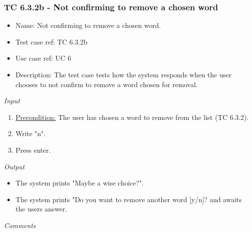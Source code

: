 \documentclass[12pt, letterpaper]{article}
\begin{document}
\subsubsection{TC 6.3.2b - Not confirming to remove a chosen word}
\begin{itemize}
	\item Name: Not confirming to remove a chosen word.
	\item Test case ref: TC 6.3.2b
	\item Use case ref: UC 6
	\item Description: The test case tests how the system responds when the user chooses to not confirm to remove a word chosen for removal.
\end{itemize}
\emph{Input}
\begin{enumerate}
	\item \underline{Precondition:} The user has chosen a word to remove from the list (TC 6.3.2).
	\item Write "n".
	\item Press enter.
\end{enumerate}
\emph{Output}
\begin{itemize}
	\item The system prints "Maybe a wise choice?".
	\item The system prints "Do you want to remove another word [y/n]? and awaits the users answer.
\end{itemize}
\begin{Form}
	\newline
	\newline
\end{Form}
\newline
\emph{Comments}
\newline
\newline
\newline
\newline
\newline
\newline
\newline
\end{document}
